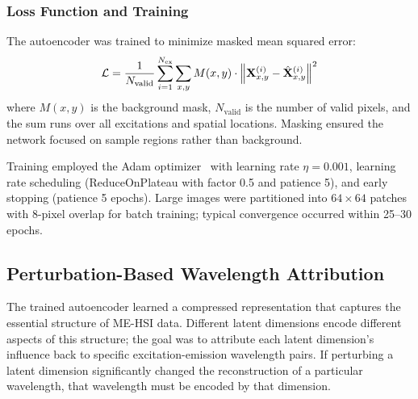 \subsubsection{Loss Function and Training}
The autoencoder was trained to minimize masked mean squared error:
\begin{equation}
\mathcal{L} = \frac{1}{N_{\text{valid}}} \sum_{i=1}^{N_{\text{ex}}} \sum_{x,y} M(x,y) \cdot \left\| \mathbf{X}^{(i)}_{x,y} - \hat{\mathbf{X}}^{(i)}_{x,y} \right\|^2
\label{eq:loss}
\end{equation}
where $M(x,y)$ is the background mask, $N_{\text{valid}}$ is the number of valid pixels, and the sum runs over all excitations and spatial locations.
Masking ensured the network focused on sample regions rather than background.

Training employed the Adam optimizer~\cite{kingma2014adam} with learning rate $\eta = 0.001$, learning rate scheduling (ReduceOnPlateau with factor 0.5 and patience 5), and early stopping (patience 5 epochs).
Large images were partitioned into $64 \times 64$ patches with 8-pixel overlap for batch training; typical convergence occurred within 25--30 epochs.

\subsection{Perturbation-Based Wavelength Attribution}
\label{sec:perturbation}

The trained autoencoder learned a compressed representation that captures the essential structure of ME-HSI data.
Different latent dimensions encode different aspects of this structure; the goal was to attribute each latent dimension's influence back to specific excitation-emission wavelength pairs.
If perturbing a latent dimension significantly changed the reconstruction of a particular wavelength, that wavelength must be encoded by that dimension.


